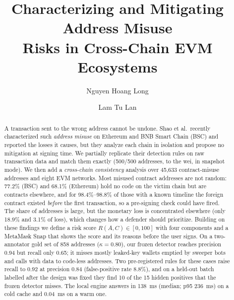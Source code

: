 \documentclass[runningheads]{llncs}
\begin{document}
\title{Characterizing and Mitigating Address Misuse\\Risks in Cross-Chain EVM Ecosystems}

\author{Nguyen Hoang Long \and
Lam Tu Lan}

\maketitle

\begin{abstract}
A transaction sent to the wrong address cannot be undone. Shao et al.\ recently
characterized such \emph{address misuse} on Ethereum and BNB Smart Chain (BSC)
and reported the losses it causes, but they analyze each chain in isolation and
propose no mitigation at signing time. We partially replicate their detection
rules on raw transaction data and match them exactly (500/500 addresses, to the
wei, in snapshot mode). We then add a \emph{cross-chain consistency} analysis
over 45{,}633 contract-misuse addresses and eight EVM networks. Most misused
contract addresses are not random: 77.2\% (BSC) and 68.1\% (Ethereum) hold no
code on the victim chain but are contracts elsewhere, and for 98.4\%--98.8\% of
those with a known timeline the foreign contract existed \emph{before} the first
transaction, so a pre-signing check could have fired. The share of addresses is
large, but the monetary loss is concentrated elsewhere (only 18.9\% and 3.1\% of
loss), which changes how a defender should prioritize. Building on these
findings we define a risk score $R(A,C)\in[0,100]$ with four components and a
MetaMask Snap that shows the score and its reasons before the user signs.
On a two-annotator gold set of 858 addresses ($\kappa=0.80$), our frozen
detector reaches precision 0.94 but recall only 0.65; it misses mostly
leaked-key wallets emptied by sweeper bots and calls with data to code-less
addresses. Two pre-registered rules for these cases raise recall to 0.92 at
precision 0.84 (false-positive rate 8.8\%), and on a held-out batch labelled
after the design was fixed they find 10 of the 15 hidden positives that the
frozen detector misses. The local engine answers in 138~ms (median; p95
236~ms) on a cold cache and 0.04~ms on a warm one.
\end{abstract}
\end{document}
